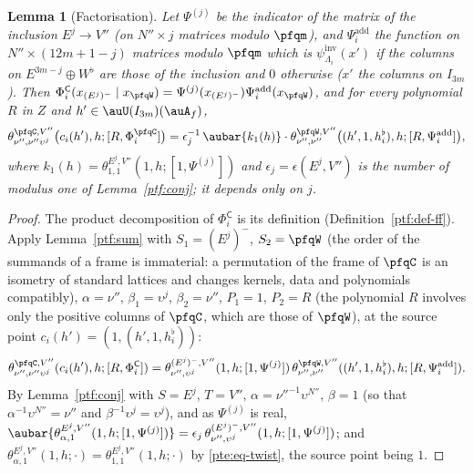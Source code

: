 \documentclass[10pt]{amsart}
\newtheorem{lemma}[theorem]{Lemma}
\theoremstyle{definition}
\theoremstyle{remark}
\begin{document}
\begin{lemma}[Factorisation]\label{pfq:factor}
Let $\Psi^{(j)}$ be the indicator of the matrix of the inclusion $E^j\to V''$ (on $N''\times j$ matrices modulo
$\pfqm$), and $\Psi^{\mathrm{add}}_i$ the function on $N''\times(12m+1-j)$ matrices modulo $\pfqm$ which is
$\psi^{\mathrm{inv}}_{\Lambda_i}(x')$ if the columns on $E^{3m-j}\oplus W^\flat$ are those of the inclusion and $0$ otherwise
($x'$ the columns on $I_{3m}$). Then $\Phi^{\mathsf C}_i(x_{(E^j)^-}\mid x_{\pfqW})=\Psi^{(j)}(x_{(E^j)^-})
\Psi^{\mathrm{add}}_i(x_{\pfqW})$, and for every polynomial $R$ in $Z$ and $h'\in\auU(I_{3m})(\auA_f)$,
\[
\theta^{\pfqC,V''}_{\nu'',\nu''\upsilon^j}\bigl(c_i(h'),h;[R,\Phi^{\pfqC}_i]\bigr)=\epsilon_j^{-1}\,\aubar{k_1(h)}\cdot
\theta^{\pfqW,V''}_{\nu'',\nu''}\bigl((h',1,h^\flat_i),h;[R,\Psi^{\mathrm{add}}_i]\bigr),
\]
where $k_1(h)=\theta^{E^j,V''}_{1,1}(1,h;[1,\Psi^{(j)}])$ and $\epsilon_j=\epsilon(E^j,V'')$ is the number of modulus one of
Lemma~\ref{ptf:conj}; it depends only on $j$.
\end{lemma}
\begin{proof}
The product decomposition of $\Phi^{\mathsf C}_i$ is its definition (Definition~\ref{ptf:def-ff}). Apply
Lemma~\ref{ptf:sum} with $S_1=(E^j)^-$, $S_2=\pfqW$ (the order of the summands of a frame is immaterial: a
permutation of the frame of $\pfqC$ is an isometry of standard lattices and changes kernels, data and polynomials
compatibly), $\alpha=\nu''$, $\beta_1=\upsilon^j$, $\beta_2=\nu''$, $P_1=1$, $P_2=R$ (the polynomial $R$ involves only
the positive columns of $\pfqC$, which are those of $\pfqW$), at the source point $c_i(h')=(1,(h',1,h^\flat_i))$:
\[
\theta^{\pfqC,V''}_{\nu'',\nu''\upsilon^j}(c_i(h'),h;[R,\Phi^{\mathsf C}_i])=\theta^{(E^j)^-,V''}_{\nu'',\upsilon^j}(1,h;[1,
\Psi^{(j)}])\,\theta^{\pfqW,V''}_{\nu'',\nu''}((h',1,h^\flat_i),h;[R,\Psi^{\mathrm{add}}_i]).
\]
By Lemma~\ref{ptf:conj} with $S=E^j$, $T=V''$, $\alpha=\nu''^{-1}\upsilon^{N''}$, $\beta=1$ (so that
$\alpha^{-1}\upsilon^{N''}=\nu''$ and $\beta^{-1}\upsilon^{j}=\upsilon^j$), and as $\Psi^{(j)}$ is real,
$\aubar{\theta^{E^j,V''}_{\alpha,1}(1,h;[1,\Psi^{(j)}])}=\epsilon_j\,\theta^{(E^j)^-,V''}_{\nu'',\upsilon^j}(1,h;[1,\Psi^{(j)}])$;
and $\theta^{E^j,V''}_{\alpha,1}(1,h;\cdot)=\theta^{E^j,V''}_{1,1}(1,h;\cdot)$ by \eqref{pte:eq-twist}, the source point being $1$.
\end{proof}
\end{document}
